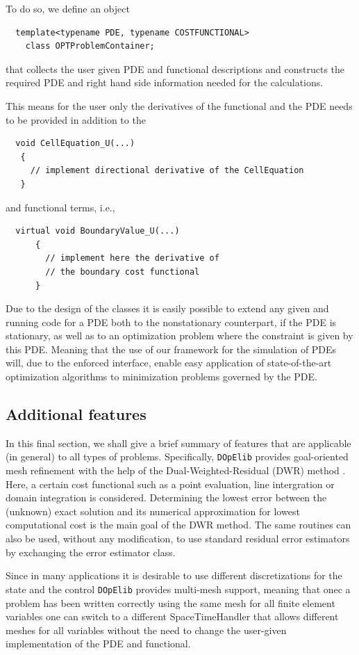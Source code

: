 \documentclass[prodmode,acmtoms]{acmsmall}
\numberwithin{equation}{section}
\newcommand{\dope}{\texttt{DOpElib}}
\begin{document}
To do so, we define an object 
\begin{lstlisting} 
  template<typename PDE, typename COSTFUNCTIONAL>
    class OPTProblemContainer;
\end{lstlisting}
that collects the user given PDE and functional descriptions and constructs the 
required PDE and right hand side information needed for the calculations.

This means for the user only the derivatives of the functional and the PDE 
needs to be provided in addition to the 
\begin{lstlisting} 
  void CellEquation_U(...)
   {
     // implement directional derivative of the CellEquation
   }
\end{lstlisting}
and functional terms, i.e.,     
\begin{lstlisting} 
  virtual void BoundaryValue_U(...)
      {
        // implement here the derivative of 
        // the boundary cost functional
      }
\end{lstlisting}

Due to the design of the classes it is easily possible to extend any given 
and running code for a PDE both to the nonstationary counterpart, if the PDE is 
stationary, as well as to an optimization problem where the constraint is 
given by this PDE. Meaning that the use of our framework for the simulation of 
PDEs will, due to the enforced interface, enable easy application of state-of-the-art 
optimization algorithms to minimization problems governed by the PDE.


\subsection{Additional features}
In this final section, we shall give a brief summary of features 
that are applicable (in general) to all types of problems. Specifically,
\dope{} provides goal-oriented mesh refinement with the help of the 
Dual-Weighted-Residual (DWR) method \cite{BeRa96}. Here, a certain 
cost functional such as a point evaluation, line intergration or domain
integration is considered. Determining the lowest error between the 
(unknown) exact solution and its numerical approximation for lowest computational
cost is the main goal of the DWR method. The same routines 
can also be used, without any modification, to use standard residual error estimators by exchanging the 
error estimator class.

Since in many applications it is desirable to use different discretizations
for the state and the control \dope{} provides multi-mesh support, meaning that
onec a problem has been written correctly using the same mesh for all finite element
variables one can switch to a different SpaceTimeHandler that allows different meshes for all 
variables without the need to change the user-given implementation of the PDE and functional.
\end{document}
